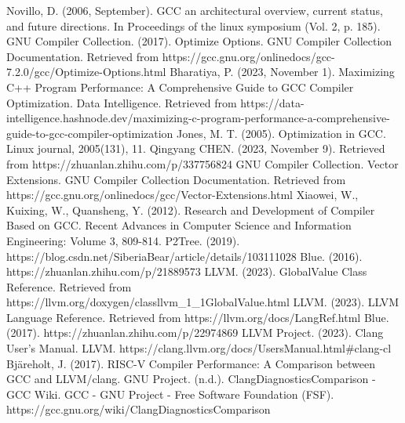 \documentclass[conference]{IEEEtran}
\begin{document}
\begin{thebibliography}{00}

	 Novillo, D. (2006, September). GCC an architectural overview, current status, and future directions. In Proceedings of the linux symposium (Vol. 2, p. 185).
	 GNU Compiler Collection. (2017). Optimize Options. GNU Compiler Collection Documentation. Retrieved from https://gcc.gnu.org/onlinedocs/gcc-7.2.0/gcc/Optimize-Options.html
	 Bharatiya, P. (2023, November 1). Maximizing C++ Program Performance: A Comprehensive Guide to GCC Compiler Optimization. Data Intelligence. Retrieved from https://data-intelligence.hashnode.dev/maximizing-c-program-performance-a-comprehensive-guide-to-gcc-compiler-optimization
	 Jones, M. T. (2005). Optimization in GCC. Linux journal, 2005(131), 11.
	 Qingyang CHEN. (2023, November 9). Retrieved from https://zhuanlan.zhihu.com/p/337756824
	 GNU Compiler Collection. Vector Extensions. GNU Compiler Collection Documentation. Retrieved from https://gcc.gnu.org/onlinedocs/gcc/Vector-Extensions.html
	 Xiaowei, W., Kuixing, W., Quansheng, Y. (2012). Research and Development of Compiler Based on GCC. Recent Advances in Computer Science and Information Engineering: Volume 3, 809-814.
	 P2Tree. (2019). https://blog.csdn.net/SiberiaBear/article/details/103111028
	 Blue. (2016). https://zhuanlan.zhihu.com/p/21889573
	 LLVM. (2023). GlobalValue Class Reference. Retrieved from https://llvm.org/doxygen/classllvm\_1\_1GlobalValue.html
	 LLVM. (2023). LLVM Language Reference. Retrieved from https://llvm.org/docs/LangRef.html
	 Blue. (2017). https://zhuanlan.zhihu.com/p/22974869
	 LLVM Project. (2023). Clang User's Manual. LLVM. https://clang.llvm.org/docs/UsersManual.html\#clang-cl
	 Bjäreholt, J. (2017). RISC-V Compiler Performance: A Comparison between GCC and LLVM/clang.
	 GNU Project. (n.d.). ClangDiagnosticsComparison - GCC Wiki. GCC - GNU Project - Free Software Foundation (FSF). https://gcc.gnu.org/wiki/ClangDiagnosticsComparison


\end{thebibliography}

\vspace{12pt}
\end{document}
